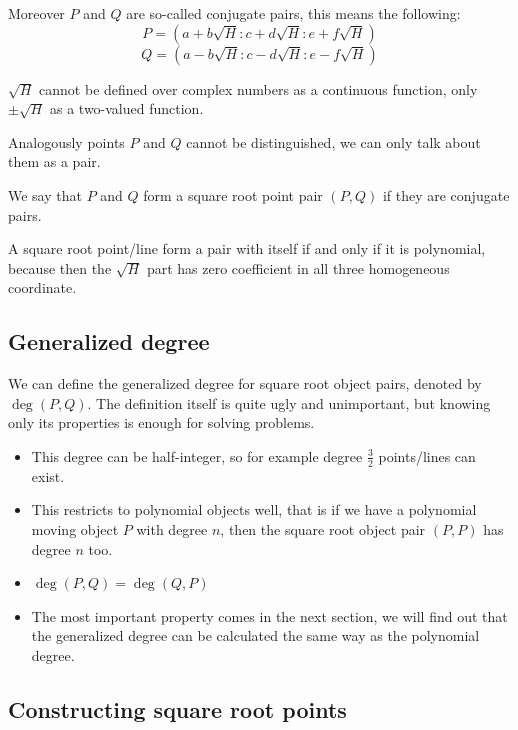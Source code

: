 \documentclass[a4paper]{article}
\begin{document}
Moreover $P$ and $Q$ are so-called conjugate pairs, this means the following:
$$P=(a+b\sqrt{H}:c+d\sqrt{H}:e+f\sqrt{H})$$
$$Q=(a-b\sqrt{H}:c-d\sqrt{H}:e-f\sqrt{H})$$

$\sqrt{H}$ cannot be defined over complex numbers as a continuous function, only $\pm \sqrt{H}$ as a two-valued function.

Analogously points $P$ and $Q$ cannot be distinguished, we can only talk about them as a pair.

\begin{definition}
    We say that $P$ and $Q$ form a square root point pair $(P,Q)$ if they are conjugate pairs.
\end{definition}

\begin{remark}
    A square root point/line form a pair with itself if and only if it is polynomial, because then the $\sqrt{H}$ part has zero coefficient in all three homogeneous coordinate.
\end{remark}



\subsection{Generalized degree}

We can define the generalized degree for square root object pairs, denoted by $\deg(P,Q)$. %
The definition itself is quite ugly and unimportant, but knowing only its properties is enough for solving problems.
\begin{itemize}
    \item This degree can be half-integer, so for example degree $\frac{3}{2}$ points/lines can exist.
    \item This restricts to polynomial objects well, that is if we have a polynomial moving object $P$ with degree $n$, then the square root object pair $(P,P)$ has degree $n$ too.
    \item $\deg (P,Q)=\deg (Q,P)$
    \item The most important property comes in the next section, we will find out that the generalized degree can be calculated the same way as the polynomial degree.
\end{itemize}
  



\subsection{Constructing square root points}
\end{document}
